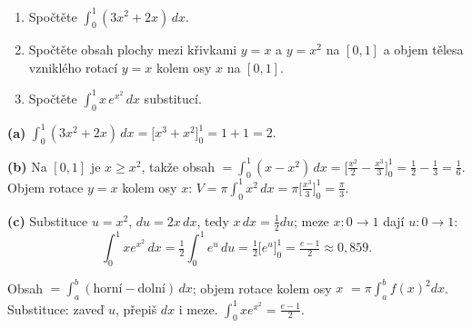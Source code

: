\begin{zadani}
\begin{enumerate}[label=(\alph*)]
  \item {} Spočtěte $\displaystyle\int_0^1 (3x^2+2x)\,dx$.
  \item {} Spočtěte obsah plochy mezi křivkami $y=x$ a $y=x^2$ na $[0,1]$ a objem tělesa vzniklého rotací $y=x$ kolem osy $x$ na $[0,1]$.
  \item {} Spočtěte $\displaystyle\int_0^1 x\,e^{x^2}\,dx$ substitucí.
\end{enumerate}
\end{zadani}

\begin{reseni}
\textbf{(a)} $\int_0^1(3x^2+2x)\,dx=\big[x^3+x^2\big]_0^1=1+1=2.$

\textbf{(b)} Na $[0,1]$ je $x\ge x^2$, takže obsah $=\int_0^1 (x-x^2)\,dx=\big[\tfrac{x^2}{2}-\tfrac{x^3}{3}\big]_0^1=\tfrac12-\tfrac13=\tfrac16$. Objem rotace $y=x$ kolem osy $x$: $V=\pi\int_0^1 x^2\,dx=\pi\big[\tfrac{x^3}{3}\big]_0^1=\tfrac{\pi}{3}$.

\textbf{(c)} Substituce $u=x^2$, $du=2x\,dx$, tedy $x\,dx=\tfrac12 du$; meze $x{:}0\to1$ dají $u{:}0\to1$:
\[
\int_0^1 x e^{x^2}\,dx=\tfrac12\int_0^1 e^{u}\,du=\tfrac12\big[e^u\big]_0^1=\tfrac{e-1}{2}\approx0{,}859.
\]
\end{reseni}

\begin{jadro}
Obsah $=\int_a^b (\text{horní}-\text{dolní})\,dx$; objem rotace kolem osy $x$ $=\pi\int_a^b f(x)^2 dx$. Substituce: zaveď $u$, přepiš $dx$ i meze. $\int_0^1 x e^{x^2}=\frac{e-1}{2}$.
\end{jadro}

